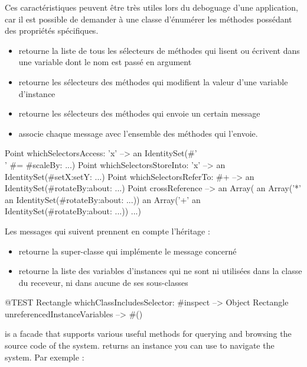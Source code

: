 \documentclass[a4paper,10pt,twoside]{book}
\begin{document}
Ces caractéristiques peuvent être très utiles lors du deboguage d'une application, car il est possible de demander à une classe d'énumérer les méthodes possédant des propriétés spécifiques.
\begin{itemize}
\item {} retourne la liste de tous les sélecteurs de méthodes qui lisent ou écrivent dans une variable dont le nom est passé en argument
\item {} retourne les sélecteurs des méthodes qui modifient la valeur d'une variable d'instance
\item {} retourne les sélecteurs des méthodes qui envoie un certain message
\item {} associe chaque message avec l'ensemble des méthodes qui l'envoie.
\end{itemize}

\begin{code}{} %
Point whichSelectorsAccess: 'x'    --> an IdentitySet(#'\\' #= #scaleBy: ...)
Point whichSelectorsStoreInto: 'x' --> an IdentitySet(#setX:setY: ...)
Point whichSelectorsReferTo: #+  --> an IdentitySet(#rotateBy:about: ...)
Point crossReference --> an Array(
		an Array('*' an IdentitySet(#rotateBy:about: ...))
		an Array('+' an IdentitySet(#rotateBy:about: ...))
		...)
\end{code}

Les messages qui suivent prennent en compte l'héritage :
\begin{itemize}
\item {} retourne la super-classe qui implémente le message concerné
\item {} retourne la liste des variables d'instances qui ne sont ni utilisées dans la classe du receveur, ni dans aucune de ses sous-classes
\end{itemize}

\begin{code}{@TEST}
Rectangle whichClassIncludesSelector: #inspect --> Object
Rectangle unreferencedInstanceVariables            --> #()
\end{code}

 is a facade that supports various useful methods for querying and browsing the source code of the system.
  returns an instance you can use to navigate the system.
Par exemple :
\end{document}
